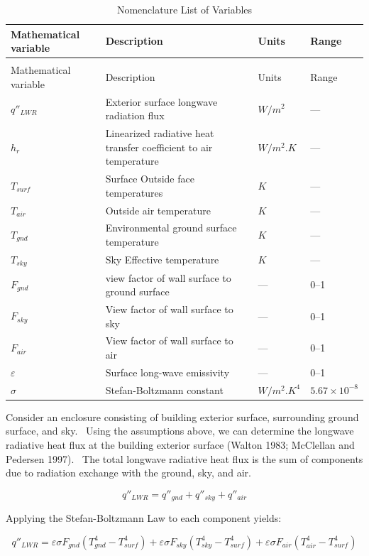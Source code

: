 \begin{longtable}[c]{p{1.0in}p{3.0in}p{1.0in}p{1.0in}}

\caption{Nomenclature List of Variables \label{table:nomenclature-list-of-variables}} \tabularnewline
\toprule 
Mathematical variable & Description & Units & Range \tabularnewline
\midrule
\endfirsthead

\caption[]{Nomenclature List of Variables} \tabularnewline
\toprule 
Mathematical variable & Description & Units & Range \tabularnewline
\midrule
\endhead

$q''_{LWR}$ & Exterior surface longwave radiation flux & $W/m^2$ & --- \tabularnewline
$h_r$ & Linearized radiative heat transfer coefficient to air temperature & $W/m^2.K$ & --- \tabularnewline
$T_{surf}$ & Surface Outside face temperatures & $K$ & --- \tabularnewline
$T_{air}$ & Outside air temperature & $K$ & --- \tabularnewline
$T_{gnd}$ & Environmental ground surface temperature & $K$ & --- \tabularnewline
$T_{sky}$ & Sky Effective temperature & $K$ & --- \tabularnewline
$F_{gnd}$ & view factor of wall surface to ground surface & --- & 0--1 \tabularnewline
$F_{sky}$ & View factor of wall surface to sky & --- & 0--1 \tabularnewline
$F_{air}$ & View factor of wall surface to air & --- & 0--1 \tabularnewline
$\varepsilon$ & Surface long-wave emissivity & --- & 0--1 \tabularnewline
$\sigma$ & Stefan-Boltzmann constant & $W/m^2.K^4$ & $5.67 \times 10^{-8}$ \tabularnewline
\bottomrule
\end{longtable}

Consider an enclosure consisting of building exterior surface, surrounding ground surface, and sky.~ Using the assumptions above, we can determine the longwave radiative heat flux at the building exterior surface (Walton 1983; McClellan and Pedersen 1997).~ The total longwave radiative heat flux is the sum of components due to radiation exchange with the ground, sky, and air.

\begin{equation}
{q''_{LWR}} = {q''_{gnd}} + {q''_{sky}} + {q''_{air}}
\end{equation}

Applying the Stefan-Boltzmann Law to each component yields:

\begin{equation}
{q''_{LWR}} = \varepsilon \sigma {F_{gnd}}(T_{gnd}^4 - T_{surf}^4) + \varepsilon \sigma {F_{sky}}(T_{sky}^4 - T_{surf}^4) + \varepsilon \sigma {F_{air}}(T_{air}^4 - T_{surf}^4)
\end{equation}

